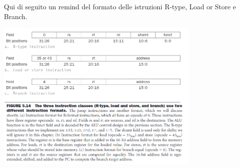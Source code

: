 \documentclass[12pt, a4paper, openany]{book}
\begin{document}
Qui di seguito un remind del formato delle istruzioni R-type, Load or Store e Branch.
\begin{center}
    \includegraphics[width=100mm, scale=0.5]{Instruction format.png}
\end{center}
\end{document}
